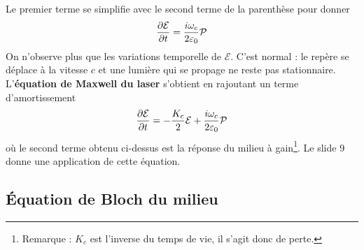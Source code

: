 Le premier terme se simplifie avec le second terme de la parenthèse pour donner 
\begin{equation}
\frac{{\partial {\cal E}}}{{\partial t}} = \frac{{i{\omega _c}}}{{2{\varepsilon _0}}}{\cal P}
\end{equation}
On n'observe plus que les variations temporelle de $\mathcal{E}$. C'est normal : le repère se 
déplace à la vitesse $c$ et une lumière qui se propage ne reste pas stationnaire. L'\textbf{équation 
de Maxwell du laser} s'obtient en rajoutant un terme d'amortissement
\begin{equation}
\frac{{\partial {\cal E}}}{{\partial t}} =  - \frac{{{K_c}}}{2}{\cal E} + \frac{{i{\omega _c}}}{{2{\varepsilon _0}}}{\cal P}
\end{equation}
où le second terme obtenu ci-dessus est la réponse du milieu à gain\footnote{Remarque : $K_c$ est l'inverse du temps de vie, il s'agit donc de perte.}. Le slide 9 donne une application de cette 
équation.

\subsection{Équation de Bloch du milieu}
